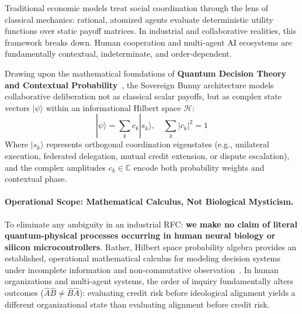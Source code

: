 \documentclass[a4paper,11pt,twoside,parskip=half-,headings=small]{scrartcl}
\begin{document}
Traditional economic models treat social coordination through the lens of classical mechanics: rational, atomized agents evaluate deterministic utility functions over static payoff matrices. In industrial and collaborative realities, this framework breaks down. Human cooperation and multi-agent AI ecosystems are fundamentally contextual, indeterminate, and order-dependent.

Drawing upon the mathematical foundations of \textbf{Quantum Decision Theory and Contextual Probability}~\cite{khrennikov2014quantum,haven2013quantum}, the Sovereign Bunny architecture models collaborative deliberation not as classical scalar payoffs, but as complex state vectors $|\psi\rangle$ within an informational Hilbert space $\mathcal{H}$:
\begin{equation}
  |\psi\rangle = \sum_{k} c_k |s_k\rangle, \quad \sum_k |c_k|^2 = 1
  \label{eq:quantum_social_state}
\end{equation}
Where $|s_k\rangle$ represents orthogonal coordination eigenstates (e.g., unilateral execution, federated delegation, mutual credit extension, or dispute escalation), and the complex amplitudes $c_k \in \mathbb{C}$ encode both probability weights and contextual phase.

\paragraph{Operational Scope: Mathematical Calculus, Not Biological Mysticism.}
To eliminate any ambiguity in an industrial RFC: \textbf{we make no claim of literal quantum-physical processes occurring in human neural biology or silicon microcontrollers}. Rather, Hilbert space probability algebra provides an established, operational mathematical calculus for modeling decision systems under incomplete information and non-commutative observation~\cite{khrennikov2014quantum}. In human organizations and multi-agent systems, the order of inquiry fundamentally alters outcomes ($\hat{A}\hat{B} \neq \hat{B}\hat{A}$): evaluating credit risk before ideological alignment yields a different organizational state than evaluating alignment before credit risk.
\end{document}
